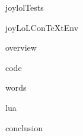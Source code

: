 
\usemodule[t-diSimp]

\startDiSimpComponent joylolTests

\diSimpEnvironment joyLoLConTeXtEnv

\startJoyLoLCoAlg[title=JoylolTests][joylolTests]

\diSimpComponent overview

\diSimpComponent code

\diSimpComponent words

\diSimpComponent lua

\diSimpComponent conclusion

\stopJoyLoLCoAlg

\stopDiSimpComponent
